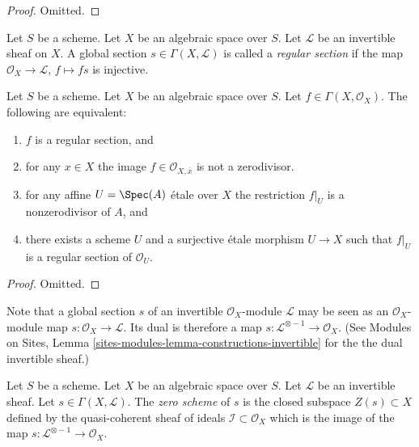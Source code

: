 \begin{proof}
Omitted.
\end{proof}

\begin{definition}
\label{definition-regular-section}
Let $S$ be a scheme. Let $X$ be an algebraic space over $S$.
Let $\mathcal{L}$ be an invertible sheaf on $X$.
A global section $s \in \Gamma(X, \mathcal{L})$ is called a
{\it regular section} if the map $\mathcal{O}_X \to \mathcal{L}$,
$f \mapsto fs$ is injective.
\end{definition}

\begin{lemma}
\label{lemma-regular-section-structure-sheaf}
Let $S$ be a scheme.
Let $X$ be an algebraic space over $S$.
Let $f \in \Gamma(X, \mathcal{O}_X)$.
The following are equivalent:
\begin{enumerate}
\item $f$ is a regular section, and
\item for any $x \in X$ the image $f \in \mathcal{O}_{X, \overline{x}}$
is not a zerodivisor.
\item for any affine $U = \Spec(A)$ \'etale over $X$
the restriction $f|_U$ is a nonzerodivisor of $A$, and
\item there exists a scheme $U$ and a surjective \'etale morphism
$U \to X$ such that $f|_U$ is a regular section of $\mathcal{O}_U$.
\end{enumerate}
\end{lemma}

\begin{proof}
Omitted.
\end{proof}

\noindent
Note that a global section $s$ of an invertible $\mathcal{O}_X$-module
$\mathcal{L}$ may be seen as an $\mathcal{O}_X$-module map
$s : \mathcal{O}_X \to \mathcal{L}$. Its dual is therefore a
map $s : \mathcal{L}^{\otimes -1} \to \mathcal{O}_X$.
(See Modules on Sites, Lemma \ref{sites-modules-lemma-constructions-invertible}
for the the dual invertible sheaf.)

\begin{definition}
\label{definition-zero-scheme-s}
Let $S$ be a scheme. Let $X$ be an algebraic space over $S$.
Let $\mathcal{L}$ be an invertible sheaf.
Let $s \in \Gamma(X, \mathcal{L})$.
The {\it zero scheme} of $s$ is the closed subspace $Z(s) \subset X$
defined by the quasi-coherent sheaf of ideals
$\mathcal{I} \subset \mathcal{O}_X$ which is the image of the
map $s : \mathcal{L}^{\otimes -1} \to \mathcal{O}_X$.
\end{definition}

